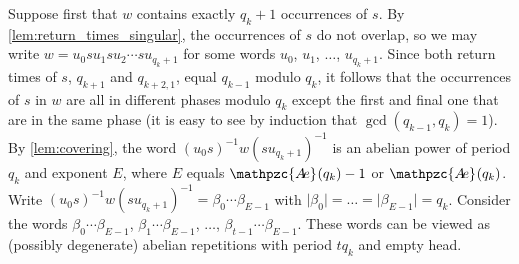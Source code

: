 \documentclass[a4paper,fleqn]{article}
\providecommand{\abs}[1]{\lvert#1\rvert}
\newcommand{\abexp}[2][]{\mathpzc{A\mkern-3mu e}_{#1}(#2)}
\begin{document}
  Suppose first that $w$ contains exactly $q_k + 1$ occurrences of $s$. By \autoref{lem:return_times_singular}, the
  occurrences of $s$ do not overlap, so we may write $w = u_0 s u_1 s u_2 \cdots s u_{q_k + 1}$ for some words $u_0$,
  $u_1$, $\ldots$, $u_{q_k + 1}$. Since both return times of $s$, $q_{k+1}$ and $q_{k+2,1}$, equal $q_{k-1}$ modulo
  $q_k$, it follows that the occurrences of $s$ in $w$ are all in different phases modulo $q_k$ except the first and
  final one that are in the same phase (it is easy to see by induction that $\gcd(q_{k-1}, q_k) = 1$). By
  \autoref{lem:covering}, the word $(u_0 s)^{-1} w (s u_{q_k + 1})^{-1}$ is an abelian power of period $q_k$ and
  exponent $E$, where $E$ equals $\abexp{q_k} - 1$ or $\abexp{q_k}$. Write
  $(u_0 s)^{-1} w (s u_{q_k + 1})^{-1} = \beta_0 \cdots \beta_{E-1}$ with
  $\abs{\beta_0} = \ldots = \abs{\beta_{E-1}} = q_k$. Consider the words $\beta_0 \cdots \beta_{E-1}$,
  $\beta_1 \cdots \beta_{E-1}$, $\ldots$, $\beta_{t-1} \cdots \beta_{E-1}$. These words can be viewed as (possibly
  degenerate) abelian repetitions with period $tq_k$ and empty head.
\end{document}
